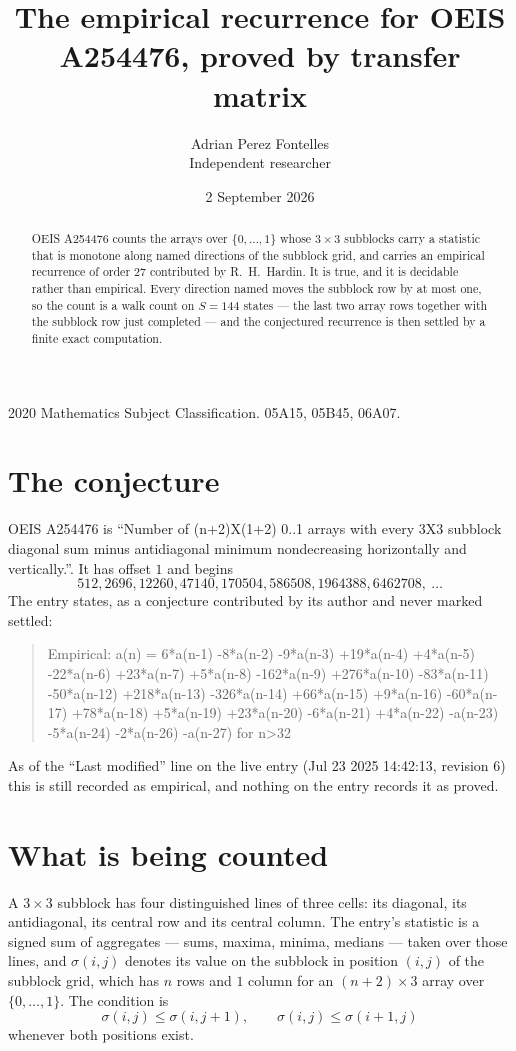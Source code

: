 \documentclass[11pt,a4paper]{article}
\title{The empirical recurrence for OEIS A254476, proved by transfer matrix}
\author{Adrian Perez Fontelles\\ \small Independent researcher}
\date{2 September 2026}
\theoremstyle{plain}
\theoremstyle{definition}
\begin{document}
\maketitle

\begin{abstract}
OEIS A254476 counts the arrays over $\{0,\dots,1\}$ whose $3\times3$ subblocks carry a
statistic that is monotone along named directions of the subblock grid, and carries an
empirical recurrence of order $27$ contributed by R.~H.~Hardin. It is true, and it is
decidable rather than empirical. Every direction named moves the subblock row by at most one,
so the count is a walk count on $S=144$ states --- the last two array rows together with the
subblock row just completed --- and the conjectured recurrence is then settled by a finite
exact computation.
\end{abstract}

\noindent\small 2020 Mathematics Subject Classification. 05A15, 05B45, 06A07.\normalsize

\section{The conjecture}

OEIS A254476 is ``Number of (n+2)X(1+2) 0..1 arrays with every 3X3 subblock diagonal sum minus antidiagonal minimum nondecreasing horizontally and vertically.''. It has offset $1$ and begins
\[
512, 2696, 12260, 47140, 170504, 586508, 1964388, 6462708,\ \dots
\]
The entry states, as a conjecture contributed by its author and never marked settled:
\begin{quote}
Empirical: a(n) = 6*a(n-1) -8*a(n-2) -9*a(n-3) +19*a(n-4) +4*a(n-5) -22*a(n-6) +23*a(n-7) +5*a(n-8) -162*a(n-9) +276*a(n-10) -83*a(n-11) -50*a(n-12) +218*a(n-13) -326*a(n-14) +66*a(n-15) +9*a(n-16) -60*a(n-17) +78*a(n-18) +5*a(n-19) +23*a(n-20) -6*a(n-21) +4*a(n-22) -a(n-23) -5*a(n-24) -2*a(n-26) -a(n-27) for n>32
\end{quote}
As of the ``Last modified'' line on the live entry (Jul 23 2025 14:42:13, revision 6) this is still
recorded as empirical, and nothing on the entry records it as proved.

\section{What is being counted}

A $3\times3$ subblock has four distinguished lines of three cells: its diagonal, its
antidiagonal, its central row and its central column. The entry's statistic is a signed sum of
aggregates --- sums, maxima, minima, medians --- taken over those lines, and $\sigma(i,j)$
denotes its value on the subblock in position $(i,j)$ of the subblock grid, which has $n$ rows
and $1$ column for an $(n+2)\times3$ array over $\{0,\dots,1\}$. The condition is
\[
\sigma(i,j)\le\sigma(i,j+1),\qquad \sigma(i,j)\le\sigma(i+1,j)
\]
whenever both positions exist.
\end{document}
